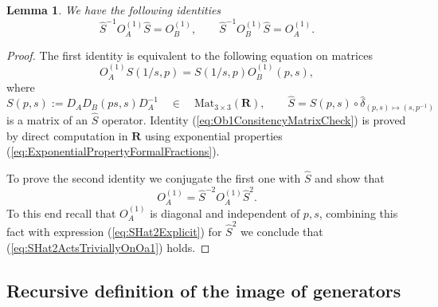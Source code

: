 \documentclass{amsart}
\newtheorem{lemma}[theorem]{Lemma}
\begin{document}
\begin{lemma} We have the following identities
\begin{equation}
\widehat S^{-1}O_A^{(1)}\widehat S=O_B^{(1)},\qquad \widehat S^{-1}O_B^{(1)}\widehat S=O_A^{(1)}.
\label{eq:SConjugationg1}
\end{equation}
\label{lemm:SConjugationg1}
\end{lemma}
\begin{proof}
The first identity is equivalent to the following equation on matrices
\begin{equation}
O_A^{(1)}S(1/s,p)=S(1/s,p)O_B^{(1)}(p,s),
\label{eq:Ob1ConsitencyMatrixCheck}
\end{equation}
where
\begin{equation*}
S(p,s):=D_AD_B(ps,s)D_A^{-1}\quad\in\quad\mathrm{Mat}_{3\times3}(\mathbf R),\qquad \widehat S=S(p,s)\circ\widehat\delta_{(p,s)\mapsto(s,p^{-1})}
\end{equation*}
is a matrix of an $\widehat S$ operator. Identity (\ref{eq:Ob1ConsitencyMatrixCheck}) is proved by direct computation in $\mathbf R$ using exponential properties (\ref{eq:ExponentialPropertyFormalFractions}).

To prove the second identity we conjugate the first one with $\widehat S$ and show that
\begin{equation}
O_A^{(1)}=\widehat S^{-2}O_A^{(1)}\widehat S^2.
\label{eq:SHat2ActsTriviallyOnOa1}
\end{equation}
To this end recall that $O_A^{(1)}$ is diagonal and independent of $p,s$, combining this fact with expression (\ref{eq:SHat2Explicit}) for $\widehat S^2$ we conclude that (\ref{eq:SHat2ActsTriviallyOnOa1}) holds.
\end{proof}

\subsection{Recursive definition of the image of generators}
\end{document}
